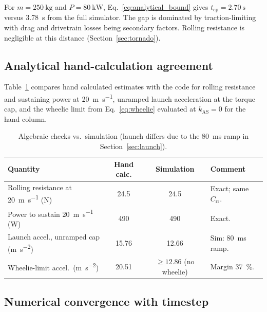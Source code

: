 \documentclass[11pt, a4paper]{report}
\numberwithin{equation}{section}
\begin{document}
\begin{refsection}
For $m=\SI{250}{\kilo\gram}$ and $P=\SI{80}{\kilo\watt}$,
Eq.~\ref{eq:analytical_bound} gives $t_\text{cp}=\SI{2.70}{\second}$
versus \SI{3.78}{\second} from the full simulator. The gap is dominated
by traction-limiting with drag and drivetrain losses being secondary factors. Rolling
resistance is negligible at this distance (Section~\ref{sec:tornado}).

\subsection{Analytical hand-calculation agreement}
\label{sec:handcalc}

Table~\ref{tab:handcalc} compares hand calculated estimates with the code for
rolling resistance and sustaining power at \SI{20}{\metre\per\second},
unramped launch acceleration at the torque cap, and the wheelie limit
from Eq.~\ref{eq:wheelie} evaluated at $k_\text{AS}=0$ for the hand column.

\begin{table}[H]
\centering
\caption{Algebraic checks vs.\ simulation (launch differs due to the
\SI{80}{\milli\second} ramp in Section~\ref{sec:launch}).}
\label{tab:handcalc}
\footnotesize
\setlength{\tabcolsep}{4pt}
\begin{tabularx}{\textwidth}{|>{\raggedright\arraybackslash\hsize=1.55\hsize}X|c|c|>{\raggedright\arraybackslash\hsize=0.45\hsize}X|}
\hline
\textbf{Quantity} & \textbf{Hand calc.} & \textbf{Simulation} & \textbf{Comment} \\
\hline
Rolling resistance at \SI{20}{\metre\per\second} (\si{\newton})
  & 24.5 & 24.5 & Exact; same $C_\text{rr}$. \\
Power to sustain \SI{20}{\metre\per\second} (\si{\watt})
  & 490 & 490 & Exact. \\
Launch accel., unramped cap (\si{\metre\per\second\squared})
  & 15.76 & 12.66 & Sim: \SI{80}{\milli\second} ramp. \\
Wheelie-limit accel.\ (\si{\metre\per\second\squared})
  & 20.51 & $\ge 12.86$ (no wheelie) & Margin \SI{37}{\percent}. \\
\hline
\end{tabularx}
\end{table}

\subsection{Numerical convergence with timestep}
\label{sec:convergence}


\end{refsection}
\end{document}
